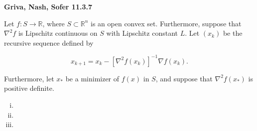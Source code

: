 \textbf{Griva, Nash, Sofer 11.3.7}

Let $f:S \to \mathbb{R}$, where $S \subset \mathbb{R}^n$ is an open convex set. Furthermore, suppose that $\nabla^2f$ is
Lipschitz continuous on $S$ with Lipschitz constant $L$. Let $(x_k)$ be the recursive sequence defined by

$$
x_{k+1} = x_k - \left[\nabla^2 f(x_k) \right]^{-1} \nabla f(x_k).
$$

Furthermore, let $x_*$ be a minimizer of $f(x)$ in $S$, and suppose that $\nabla^2 f(x_*)$ is positive definite.

\begin{enumerate}[(i)]
  \item 
  \pagebreak
  \item 
  \pagebreak
  \item 
\end{enumerate}
